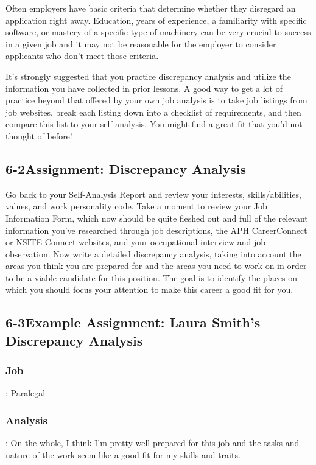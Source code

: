 Often employers have basic criteria that determine whether they disregard an application right away. Education, years of experience, a familiarity with specific software, or mastery of a specific type of machinery can be very crucial to success in a given job and it may not be reasonable for the employer to consider applicants who don't meet those criteria.

It's strongly suggested that you practice discrepancy analysis and utilize the information you have collected in prior lessons. A good way to get a lot of practice beyond that offered by your own job analysis is to take job listings from job websites, break each listing down into a checklist of requirements, and then compare this list to your self-analysis. You might find a great fit that you'd not thought of before!

\pagebreak \subsection*{6-2\quad Assignment: Discrepancy Analysis}
Go back to your Self-Analysis Report and review your interests, skills/abilities, values, and work personality code. Take a moment to review your Job Information Form, which now should be quite fleshed out and full of the relevant information you've researched through job descriptions, the APH CareerConnect or NSITE Connect websites, and your occupational interview and job observation. Now write a detailed discrepancy analysis, taking into account the areas you think you are prepared for and the areas you need to work on in order to be a viable candidate for this position. The goal is to identify the places on which you should focus your attention to make this career a good fit for you.

\pagebreak \subsection*{6-3\quad Example Assignment: Laura Smith's Discrepancy Analysis}
\subsubsection*{Job}: Paralegal

\subsubsection*{Analysis}: On the whole, I think I'm pretty well prepared for this job and the tasks and nature of the work seem like a good fit for my skills and traits.

